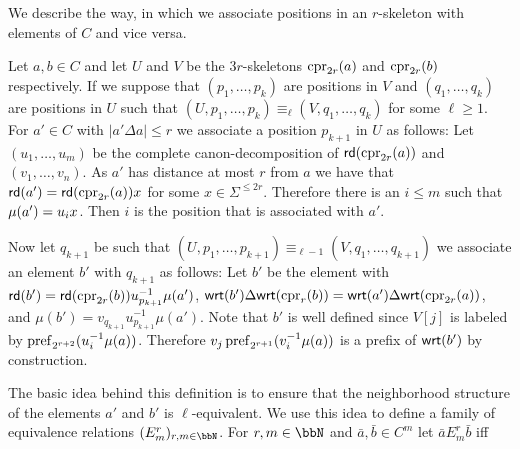We describe the way, in which we associate positions in an $r$-skeleton with elements of $C$ and vice versa. 
\begin{definition}
	Let $a,b\in C$ and let $U$ and $V$ be the $3r$-skeletons $\operatorname{cpr}_{2r}(a)$ and $\operatorname{cpr}_{2r}(b)$ respectively. If we suppose that $(p_1,\ldots,p_k)$ are positions in $V$ and $(q_1,\ldots,q_k)$ are positions in $U$ such that $(U,p_1,\ldots,p_k) \equiv_{\ell} (V,q_1,\ldots,q_k)$ for some $\ell \geq 1$. For $a'\in C$ with $|a'\Delta a| \leq r$ we associate a position $p_{k+1}$ in $U$ as follows:
	Let $(u_1,\ldots, u_m)$ be the complete canon-decomposition of $\mathsf{rd}(\operatorname{cpr}_{2r}(a))$ and $(v_1,\ldots,v_n)$. As $a'$ has distance at most $r$ from $a$ we have that $\mathsf{rd}(a') = \mathsf{rd}(\operatorname{cpr}_{2r}(a))x$
	for some $x\in \Sigma^{\leq 2r}$. Therefore there is an $i\leq m$ such that $\mu(a') = u_ix$. Then $i$ is the position that is associated with $a'$.
	
	Now let $q_{k+1}$ be such that $(U,p_1,\ldots,p_{k+1}) \equiv_{\ell-1} (V,q_1,\ldots,q_{k+1})$ we associate an element $b'$ with $q_{k+1}$ as follows:
	Let $b'$ be the element with $\mathsf{rd}(b') = \mathsf{rd}(\operatorname{cpr}_{2r}(b))u_{p_{k+1}}^{-1}\mu(a')$, $\mathsf{wrt}(b')\Delta\mathsf{wrt}(\operatorname{cpr}_r({b})) = \mathsf{wrt}(a')\Delta\mathsf{wrt}(\operatorname{cpr}_{2r}({a}))$, and 
	$\mu(b') = v_{q_{k+1}}u_{p_{k+1}}^{-1}\mu(a')$. Note that $b'$ is well defined since $V[j]$ is labeled by $\operatorname{pref}_{2^{r+2}}(u_i^{-1}\mu({a}))$. Therefore $v_j\operatorname{pref}_{2^{r+1}}(v_i^{-1}\mu(a))$ is a prefix of $\mathsf{wrt}(b')$ by construction.
\end{definition}
The basic idea behind this definition is to ensure that the neighborhood structure of the elements $a'$ and $b'$ is $\ell$-equivalent. We use this idea to  define a family of  equivalence relations $(E^r_m)_{r,m\in\bbN}$.
For $r,m\in \bbN$ and $\bar{a},\bar{b}\in C^m$ let $\bar{a} E^r_m \bar{b}$ iff
